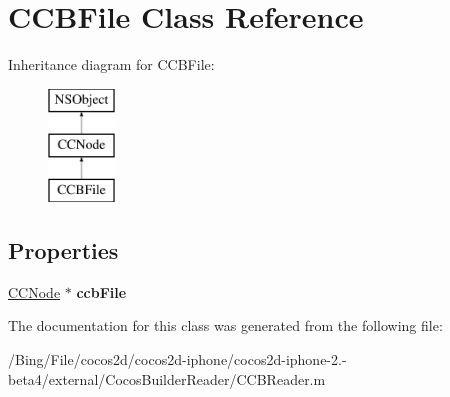 \hypertarget{interface_c_c_b_file}{\section{C\-C\-B\-File Class Reference}
\label{interface_c_c_b_file}
}
Inheritance diagram for C\-C\-B\-File\-:\begin{figure}[H]
\begin{center}
\leavevmode
\includegraphics[height=3.000000cm]{interface_c_c_b_file}
\end{center}
\end{figure}
\subsection*{Properties}
\begin{DoxyCompactItemize}
\item 
\hypertarget{interface_c_c_b_file_a0d94da279e77304e465c880c2346ed39}{\hyperlink{class_c_c_node}{C\-C\-Node} $\ast$ {\bfseries ccb\-File}}\label{interface_c_c_b_file_a0d94da279e77304e465c880c2346ed39}

\end{DoxyCompactItemize}


The documentation for this class was generated from the following file\-:\begin{DoxyCompactItemize}
\item 
/\-Bing/\-File/cocos2d/cocos2d-\/iphone/cocos2d-\/iphone-\/2.-\/beta4/external/\-Cocos\-Builder\-Reader/C\-C\-B\-Reader.\-m\end{DoxyCompactItemize}
